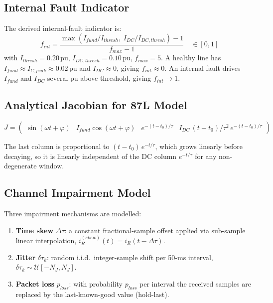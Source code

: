 \documentclass[12pt,a4paper]{article}
\newcommand{\Idc}{I_{DC}}
\begin{document}
\subsection{Internal Fault Indicator}
\label{sec:87L_fint}

The derived internal-fault indicator is:
\begin{equation}
  f_{int} = \frac{\max\!\left(I_{fund}/I_{thresh},\;
                              \Idc/I_{DC,thresh}\right) - 1}
                 {f_{max} - 1}
  \quad\in [0,1]
  \label{eq:fint_87L}
\end{equation}
with $I_{thresh} = 0.20$\,pu, $I_{DC,thresh} = 0.10$\,pu, $f_{max} = 5$.
A healthy line has $I_{fund} \approx I_{C,peak} \approx 0.02$\,pu and
$\Idc \approx 0$, giving $f_{int} \approx 0$.  An internal fault drives
$I_{fund}$ and $\Idc$ several pu above threshold, giving $f_{int} \to 1$.

\subsection{Analytical Jacobian for 87L Model}
\label{sec:87L_jacobian}

\begin{equation}
J = \begin{pmatrix}
  \sin(\omega t+\varphi) & I_{fund}\cos(\omega t+\varphi) &
  e^{-(t-t_0)/\tau} & \Idc\,(t-t_0)/\tau^2\,e^{-(t-t_0)/\tau}
\end{pmatrix}
\label{eq:J_87L}
\end{equation}

The last column is proportional to $(t-t_0)\,e^{-t/\tau}$, which grows
linearly before decaying, so it is linearly independent of the DC column
$e^{-t/\tau}$ for any non-degenerate window.

\subsection{Channel Impairment Model}
\label{sec:87L_channel}

Three impairment mechanisms are modelled:

\begin{enumerate}
  \item \textbf{Time skew} $\Delta\tau$: a constant fractional-sample offset
        applied via sub-sample linear interpolation,
        $i_R^{(skew)}(t) = i_R(t - \Delta\tau)$.
  \item \textbf{Jitter} $\delta\tau_k$: random i.i.d.\ integer-sample
        shift per 50-ms interval, $\delta\tau_k \sim \mathcal{U}[-N_J, N_J]$.
  \item \textbf{Packet loss} $p_{loss}$: with probability $p_{loss}$ per
        interval the received samples are replaced by the last-known-good
        value (hold-last).
\end{enumerate}
\end{document}
